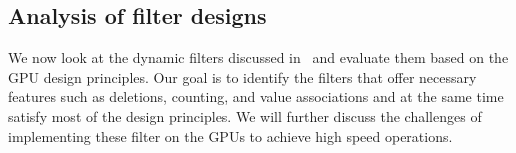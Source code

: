 



\iffalse

\subsection{Analysis of filter designs}

We now look at the dynamic filters discussed in~ and evaluate
them based on the GPU design principles.  Our goal is to identify the filters
that offer necessary features such as deletions, counting, and value
associations and at the same time satisfy most of the design principles.  We
will further discuss the challenges of implementing these filter on the GPUs to
achieve high speed operations.

